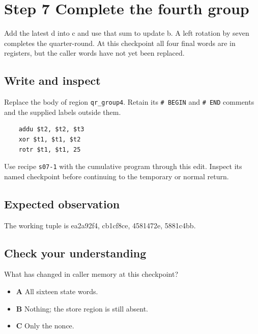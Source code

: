 \section{Step 7 Complete the fourth group}\label{chacha-s07}

Add the latest d into c and use that sum to update b. A left rotation by seven completes the quarter-round. At this checkpoint all four final words are in registers, but the caller words have not yet been replaced.

\subsection{Write and inspect}
Replace the body of region \texttt{qr\_group4}. Retain its \texttt{\# BEGIN} and \texttt{\# END} comments and the supplied labels outside them.

\begin{verbatim}
    addu $t2, $t2, $t3
    xor $t1, $t1, $t2
    rotr $t1, $t1, 25
\end{verbatim}

Use recipe \texttt{s07-1} with the cumulative program through this edit. Inspect its named checkpoint before continuing to the temporary or normal return.

\subsection{Expected observation}
The working tuple is ea2a92f4, cb1cf8ce, 4581472e, 5881c4bb.

\subsection{Check your understanding}
What has changed in caller memory at this checkpoint?

\begin{itemize}
  \item \textbf{A} All sixteen state words.
  \item \textbf{B} Nothing; the store region is still absent.
  \item \textbf{C} Only the nonce.
\end{itemize}
